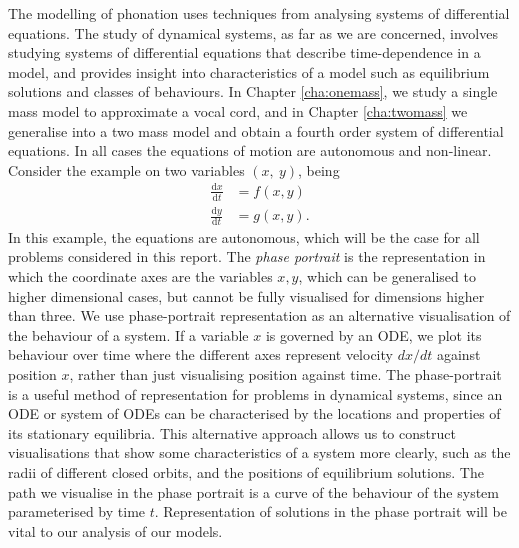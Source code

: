 \documentclass{report}
\begin{document}
The modelling of phonation uses techniques from analysing systems of differential equations.
The study of dynamical systems, as far as we are concerned,
involves studying systems of differential equations that describe time-dependence in a model,
and provides insight into characteristics of a model such as equilibrium solutions and classes of behaviours.
In Chapter \ref{cha:onemass}, we study a single mass model to approximate a vocal cord,
and in Chapter \ref{cha:twomass} we generalise into a two mass model and obtain a fourth order system of differential equations.
In all cases the equations of motion are autonomous and non-linear.
Consider the example on two variables \((x,~y)\), being
\begin{equation}
    \begin{aligned}
        \frac{\mathrm{d}x}{\mathrm{d}t} &= f(x,y) \\
        \frac{\mathrm{d}y}{\mathrm{d}t} &= g(x,y).
    \end{aligned}
\end{equation}
In this example,
the equations are autonomous,
which will be the case for all problems considered in this report.
The \textit{phase portrait} is the representation in which the coordinate axes are the variables $x,y$,
which can be generalised to higher dimensional cases,
but cannot be fully visualised for dimensions higher than three.
We use phase-portrait representation as an alternative visualisation of the behaviour of a system.
If a variable $x$ is governed by an ODE,
we plot its behaviour over time where the different axes represent velocity $dx/dt$ against position $x$,
rather than just visualising position against time.
The phase-portrait is a useful method of representation for problems in dynamical systems,
since an ODE or system of ODEs can be characterised by the locations and properties of its stationary equilibria.
This alternative approach allows us to construct visualisations that show some characteristics of a system more clearly, such as the radii of different closed orbits,
and the positions of equilibrium solutions.
The path we visualise in the phase portrait is a curve of the behaviour of the system parameterised by time $t$. 
Representation of solutions in the phase portrait will be vital to our analysis of our models.
\end{document}

